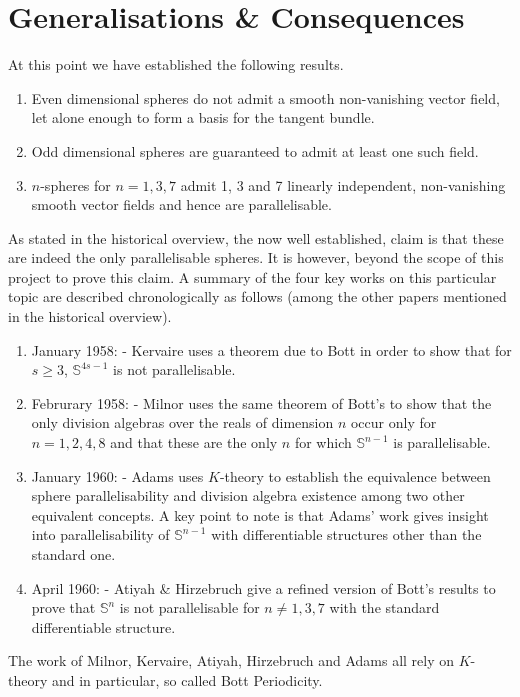 \documentclass[12pt,a4paper]{article}
\numberwithin{equation}{section}
\theoremstyle{definition}
\theoremstyle{remark}
\begin{document}
\section{Generalisations \& Consequences}
At this point we have established the following results.
\begin{enumerate}
\item Even dimensional spheres do not admit a smooth non-vanishing vector field, let alone enough to form a basis for the tangent bundle.
\item Odd dimensional spheres are guaranteed to admit at least one such field.
\item $n$-spheres for $n=1,3,7$ admit 1, 3 and 7 linearly independent, non-vanishing smooth vector fields and hence are parallelisable.
\end{enumerate}
As stated in the historical overview, the now well established, claim is that these are indeed the only parallelisable spheres. It is however, beyond the scope of this project to prove this claim. A summary of the four key works on this particular topic are described chronologically as follows (among the other papers mentioned in the historical overview).
\begin{enumerate}
\item January 1958: \cite{MR3075371} - Kervaire uses a theorem due to Bott in order to show that for $s\geq 3$, $\mathbb{S}^{4s-1}$ is not parallelisable. 
\item Februrary 1958: \cite{MR0102805} - Milnor uses the same theorem of Bott's to show that the only division algebras over the reals of dimension $n$ occur only for $n=1,2,4,8$ and that these are the only $n$ for which $\mathbb{S}^{n-1}$ is parallelisable. 
\item January 1960: \cite{MR0141119} - Adams uses $K$-theory to establish the equivalence between sphere parallelisability and division algebra existence among two other equivalent concepts. A key point to note is that Adams' work gives insight into parallelisability of $\mathbb{S}^{n-1}$ with differentiable structures other than the standard one.
\item April 1960: \cite{atiyah1961bott} - Atiyah \& Hirzebruch give a refined version of Bott's results to prove that $\mathbb{S}^n$ is not parallelisable for $n\neq 1,3,7$ with the standard differentiable structure. 
\end{enumerate}
The work of Milnor, Kervaire, Atiyah, Hirzebruch and Adams all rely on $K$-theory and in particular, so called Bott Periodicity.
%
\end{document}
